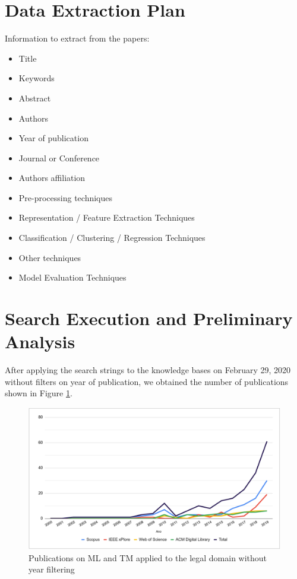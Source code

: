 \section{Data Extraction Plan}

Information to extract from the papers:

\begin{itemize}[noitemsep]
    \item Title
    \item Keywords
    \item Abstract
    \item Authors
    \item Year of publication
    \item Journal or Conference
    \item Authors affiliation
    \item Pre-processing techniques
    \item Representation / Feature Extraction Techniques
    \item Classification  / Clustering / Regression Techniques
    \item Other techniques
    \item Model Evaluation Techniques
\end{itemize}


\section{Search Execution and Preliminary Analysis}

After applying the search strings to the knowledge bases on February 29, 2020 without filters on year of publication, we obtained the number of publications shown in Figure \ref{fig:ap_rsl_tm_law}.

\begin{figure}[H]
    \centering
    \caption{Publications on ML and TM applied to the legal domain without year filtering}
    \label{fig:ap_rsl_tm_law}
    \includegraphics[width=\textwidth]{images/appendix/artigos_tm_law.png}
\end{figure}

